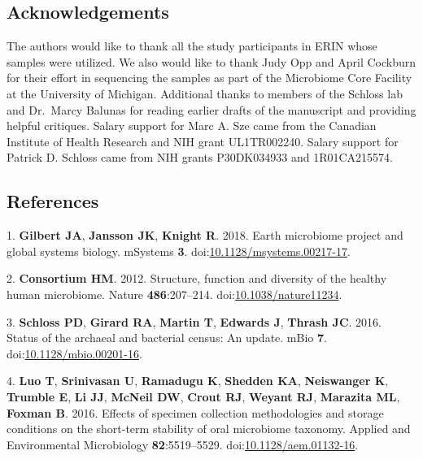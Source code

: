 \documentclass[11pt,]{article}
\begin{document}
\newpage

\subsection{Acknowledgements}\label{acknowledgements}

The authors would like to thank all the study participants in ERIN whose
samples were utilized. We also would like to thank Judy Opp and April
Cockburn for their effort in sequencing the samples as part of the
Microbiome Core Facility at the University of Michigan. Additional
thanks to members of the Schloss lab and Dr.~Marcy Balunas for reading
earlier drafts of the manuscript and providing helpful critiques. Salary
support for Marc A. Sze came from the Canadian Institute of Health
Research and NIH grant UL1TR002240. Salary support for Patrick D.
Schloss came from NIH grants P30DK034933 and 1R01CA215574.

\newpage

\subsection{References}\label{references}

\hypertarget{refs}{}
\hypertarget{ref-Gilbert2018}{}
1. \textbf{Gilbert JA}, \textbf{Jansson JK}, \textbf{Knight R}. 2018.
Earth microbiome project and global systems biology. mSystems
\textbf{3}.
doi:\href{https://doi.org/10.1128/msystems.00217-17}{10.1128/msystems.00217-17}.

\hypertarget{ref-HMP2012}{}
2. \textbf{Consortium HM}. 2012. Structure, function and diversity of
the healthy human microbiome. Nature \textbf{486}:207--214.
doi:\href{https://doi.org/10.1038/nature11234}{10.1038/nature11234}.

\hypertarget{ref-Schloss2016}{}
3. \textbf{Schloss PD}, \textbf{Girard RA}, \textbf{Martin T},
\textbf{Edwards J}, \textbf{Thrash JC}. 2016. Status of the archaeal and
bacterial census: An update. mBio \textbf{7}.
doi:\href{https://doi.org/10.1128/mbio.00201-16}{10.1128/mbio.00201-16}.

\hypertarget{ref-Luo2016}{}
4. \textbf{Luo T}, \textbf{Srinivasan U}, \textbf{Ramadugu K},
\textbf{Shedden KA}, \textbf{Neiswanger K}, \textbf{Trumble E},
\textbf{Li JJ}, \textbf{McNeil DW}, \textbf{Crout RJ}, \textbf{Weyant
RJ}, \textbf{Marazita ML}, \textbf{Foxman B}. 2016. Effects of specimen
collection methodologies and storage conditions on the short-term
stability of oral microbiome taxonomy. Applied and Environmental
Microbiology \textbf{82}:5519--5529.
doi:\href{https://doi.org/10.1128/aem.01132-16}{10.1128/aem.01132-16}.
\end{document}
